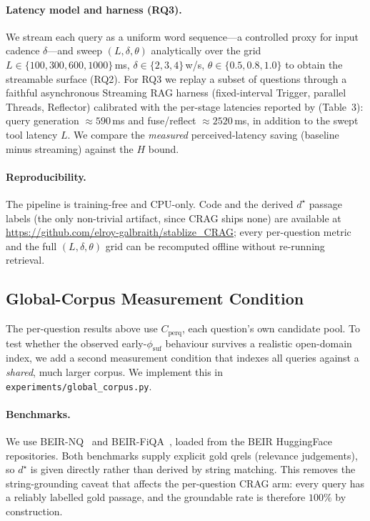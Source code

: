 \documentclass[11pt]{article}
\renewcommand{\cite}{\citep}                         %
\newcommand{\qgenMs}{590}            %
\newcommand{\fuseMs}{2520}           %
\begin{document}
\paragraph{Latency model and harness (RQ3).} We stream each query as a uniform
word sequence---a controlled proxy for input cadence $\delta$---and sweep
$(L,\delta,\theta)$ analytically over the grid
$L\in\{100,300,600,1000\}$\,ms, $\delta\in\{2,3,4\}$\,w/s, $\theta\in\{0.5,0.8,1.0\}$
to obtain the streamable surface (RQ2). For RQ3 we replay a subset of questions
through a faithful asynchronous Streaming RAG harness (fixed-interval Trigger,
parallel Threads, Reflector) calibrated with the per-stage latencies reported by
\citet{arora2025streamrag} (Table~3): query generation $\approx\qgenMs{}$\,ms and
fuse/reflect $\approx\fuseMs{}$\,ms, in addition to the swept tool latency $L$. We
compare the \emph{measured} perceived-latency saving (baseline minus streaming)
against the $H$ bound.

\paragraph{Reproducibility.} The pipeline is training-free and CPU-only. Code and
the derived $d^\star$ passage labels (the only non-trivial artifact, since CRAG
ships none) are available at \url{https://github.com/elroy-galbraith/stablize_CRAG};
every per-question metric and the
full $(L,\delta,\theta)$ grid can be recomputed offline without re-running
retrieval.

\subsection{Global-Corpus Measurement Condition}\label{sec:method-global}

The per-question results above use $C_{\mathrm{perq}}$, each question's own
candidate pool. To test whether the observed early-$\phi_{\mathrm{suf}}$ behaviour
survives a realistic open-domain index, we add a second measurement condition
that indexes all queries against a \emph{shared}, much larger corpus. We implement
this in \texttt{experiments/\allowbreak global\_corpus.py}.

\paragraph{Benchmarks.} We use BEIR-NQ~\cite{kwiatkowski2019nq} and
BEIR-FiQA~\cite{maia2018fiqa}, loaded from the BEIR HuggingFace
repositories. Both benchmarks supply explicit gold qrels (relevance judgements),
so $d^\star$ is given directly rather than derived by string matching. This
removes the string-grounding caveat that affects the per-question CRAG arm: every
query has a reliably labelled gold passage, and the groundable rate is therefore
$100\%$ by construction.
\end{document}
